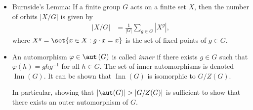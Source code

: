 \documentclass[10pt]{mypackage}
\begin{document}
\begin{itemize}
  \item Burnside's Lemma: If a finite group $G$ acts on a finite set $X$, then the number of orbits $\left\vert X/G \right\vert$ is given by
    \begin{align*}
      \left\vert X/G \right\vert &= \frac{1}{\left\vert G \right\vert}\sum_{g\in G} \left\vert X^{g} \right\vert,
    \end{align*}
    where $X^{g} = \set{x\in X : g\cdot x = x}$ is the set of fixed points of $g\in G$.
  \item An automorphism $\varphi\in \aut\left( G \right)$ is called \textit{inner} if there exists $g\in G$ such that $\varphi(h) = ghg^{-1}$ for all $h\in G$. The set of inner automorphisms is denoted $ \operatorname{Inn}(G) $. It can be shown that $\operatorname{Inn}\left( G \right)$ is isomorphic to $G/Z(G)$.

    In particular, showing that $\left\vert \aut(G) \right\vert > \left\vert G/Z(G) \right\vert$ is sufficient to show that there exists an outer automorphism of $G$.
\end{itemize}
\end{document}
